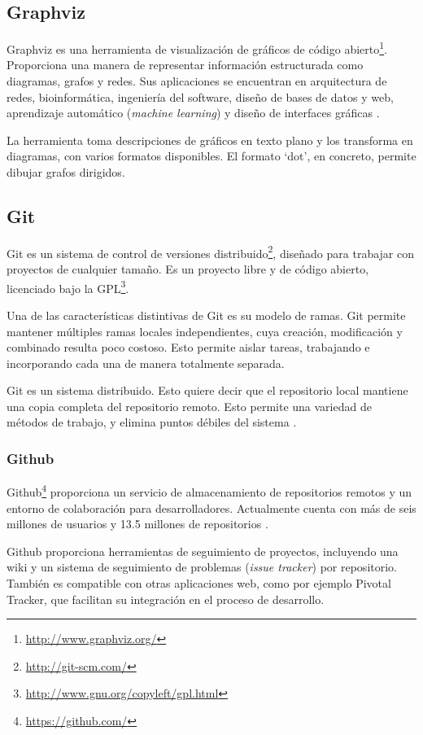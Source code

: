 \subsection{Graphviz}
Graphviz es una herramienta de visualización de gráficos de código abierto\footnote{\url{http://www.graphviz.org/}}.
Proporciona una manera de representar información estructurada como diagramas, grafos y redes.
Sus aplicaciones se encuentran en arquitectura de redes, bioinformática, ingeniería del software, diseño de bases de datos y web, aprendizaje automático (\emph{machine learning}) y diseño de interfaces gráficas \cite{website:graphviz}.

La herramienta toma descripciones de gráficos en texto plano y los transforma en diagramas, con varios formatos disponibles.
El formato `dot', en concreto, permite dibujar grafos dirigidos.

\subsection{Git}
Git es un sistema de control de versiones distribuido\footnote{\url{http://git-scm.com/}}, diseñado para trabajar con proyectos de cualquier tamaño.
Es un proyecto libre y de código abierto, licenciado bajo la GPL\footnote{\url{http://www.gnu.org/copyleft/gpl.html}}.

Una de las características distintivas de Git es su modelo de ramas.
Git permite mantener múltiples ramas locales independientes, cuya creación, modificación y combinado resulta poco costoso.
Esto permite aislar tareas, trabajando e incorporando cada una de manera totalmente separada.

Git es un sistema distribuido.
Esto quiere decir que el repositorio local mantiene una copia completa del repositorio remoto.
Esto permite una variedad de métodos de trabajo, y elimina puntos débiles del sistema \cite{website:git}.

\subsubsection{Github}
Github\footnote{\url{https://github.com/}} proporciona un servicio de almacenamiento de repositorios remotos y un entorno de colaboración para desarrolladores.
Actualmente cuenta con más de seis millones de usuarios y 13.5 millones de repositorios \cite{website:github}.

Github proporciona herramientas de seguimiento de proyectos, incluyendo una wiki y un sistema de seguimiento de problemas (\emph{issue tracker}) por repositorio.
También es compatible con otras aplicaciones web, como por ejemplo Pivotal Tracker, que facilitan su integración en el proceso de desarrollo.

